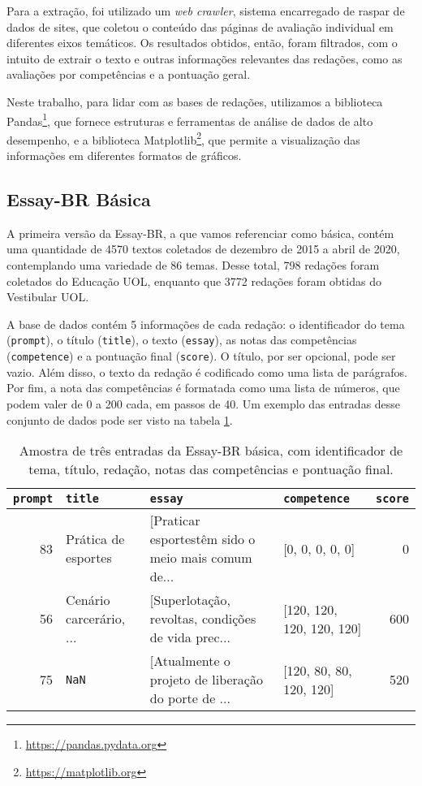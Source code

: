 Para a extração, foi utilizado um \textit{web crawler}, sistema encarregado de raspar de dados de sites, que coletou o conteúdo das páginas de avaliação individual em diferentes eixos temáticos. Os resultados obtidos, então, foram filtrados, com o intuito de extrair o texto e outras informações relevantes das redações, como as avaliações por competências e a pontuação geral.

Neste trabalho, para lidar com as bases de redações, utilizamos a biblioteca Pandas\footnote{\url{https://pandas.pydata.org}}, que fornece estruturas e ferramentas de análise de dados de alto desempenho, e a biblioteca Matplotlib\footnote{\url{https://matplotlib.org}}, que permite a visualização das informações em diferentes formatos de gráficos.

\subsection{Essay-BR Básica}
\label{subsec:essay-br-basic}

A primeira versão da Essay-BR, a que vamos referenciar como básica, contém uma quantidade de 4570 textos coletados de dezembro de 2015 a abril de 2020, contemplando uma variedade de 86 temas. Desse total, 798 redações foram coletados do Educação UOL, enquanto que 3772 redações foram obtidas do Vestibular UOL.

A base de dados contém 5 informações de cada redação: o identificador do tema (\texttt{prompt}), o título (\texttt{title}), o texto (\texttt{essay}), as notas das competências (\texttt{competence}) e a pontuação final (\texttt{score}). O título, por ser opcional, pode ser vazio. Além disso, o texto da redação é codificado como uma lista de parágrafos. Por fim, a nota das competências é formatada como uma lista de números, que podem valer de 0 a 200 cada, em passos de 40. Um exemplo das entradas desse conjunto de dados pode ser visto na tabela \ref{tab:essay-br-basic}.

\begin{table}[H]
    \caption{Amostra de três entradas da Essay-BR básica, com identificador de tema, título, redação, notas das competências e pontuação final.}
    \label{tab:essay-br-basic}
    \centering
    \begin{tabularx}{\textwidth}{rXXlr}
        \toprule
        \texttt{prompt} & \texttt{title} & \texttt{essay} & \texttt{competence} & \texttt{score} \\
        \midrule
             83 & Prática de esportes & [Praticar esportestêm sido o meio mais comum de... & [0, 0, 0, 0, 0] & 0 \\
             56 & Cenário carcerário, ... & [Superlotação, revoltas, condições de vida prec... & [120, 120, 120, 120, 120] & 600 \\
             75 & \texttt{NaN} & [Atualmente o projeto de liberação do porte de ... & [120, 80, 80, 120, 120] & 520 \\
        \bottomrule
    \end{tabularx}
\end{table}

